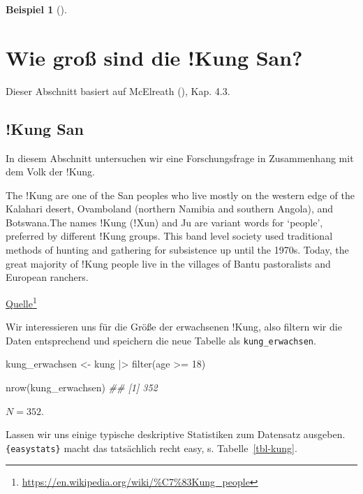 \documentclass[
  ngerman,
  letterpaper,
  twoside,
  open=any]{scrbook}
\newenvironment{Shaded}{\begin{snugshade}}{\end{snugshade}}
\newcommand{\DecValTok}[1]{\textcolor[rgb]{0.68,0.00,0.00}{#1}}
\newcommand{\DocumentationTok}[1]{\textcolor[rgb]{0.37,0.37,0.37}{\textit{#1}}}
\newcommand{\FunctionTok}[1]{\textcolor[rgb]{0.28,0.35,0.67}{#1}}
\newcommand{\NormalTok}[1]{\textcolor[rgb]{0.00,0.23,0.31}{#1}}
\newcommand{\OtherTok}[1]{\textcolor[rgb]{0.00,0.23,0.31}{#1}}
\newcommand{\SpecialCharTok}[1]{\textcolor[rgb]{0.37,0.37,0.37}{#1}}
\theoremstyle{definition}
\newtheorem{example}{Beispiel}[chapter]
\theoremstyle{plain}
\theoremstyle{definition}
\theoremstyle{definition}
\theoremstyle{remark}
\begin{document}
\begin{example}[]
\section{Wie groß sind die !Kung
San?}\label{wie-grouxdf-sind-die-kung-san}

Dieser Abschnitt basiert auf McElreath
(), Kap. 4.3.

\subsection{!Kung San}\label{kung-san}

In diesem Abschnitt untersuchen wir eine Forschungsfrage in Zusammenhang
mit dem Volk der !Kung.

\begin{displayquote}
The ǃKung are one of the San peoples who live mostly on the western edge
of the Kalahari desert, Ovamboland (northern Namibia and southern
Angola), and Botswana.The names ǃKung (ǃXun) and Ju are variant words
for \enquote*{people}, preferred by different ǃKung groups. This band
level society used traditional methods of hunting and gathering for
subsistence up until the 1970s. Today, the great majority of ǃKung
people live in the villages of Bantu pastoralists and European ranchers.
\end{displayquote}

\href{https://en.wikipedia.org/wiki/\%C7\%83Kung_people}{Quelle}\footnote{\url{https://en.wikipedia.org/wiki/\%C7\%83Kung_people}}

Wir interessieren uns für die Größe der erwachsenen !Kung, also filtern
wir die Daten entsprechend und speichern die neue Tabelle als
\texttt{kung\_erwachsen}.

\begin{Shaded}
\begin{Highlighting}[]
\NormalTok{kung\_erwachsen }\OtherTok{\textless{}{-}}\NormalTok{ kung }\SpecialCharTok{|\textgreater{}} 
  \FunctionTok{filter}\NormalTok{(age }\SpecialCharTok{\textgreater{}=} \DecValTok{18}\NormalTok{)}

\FunctionTok{nrow}\NormalTok{(kung\_erwachsen)}
\DocumentationTok{\#\# [1] 352}
\end{Highlighting}
\end{Shaded}

\(N=352\).

Lassen wir uns einige typische deskriptive Statistiken zum Datensatz
ausgeben. \texttt{\{easystats\}} macht das tatsächlich recht easy, s.
Tabelle~\ref{tbl-kung}.


\end{example}
\end{document}
